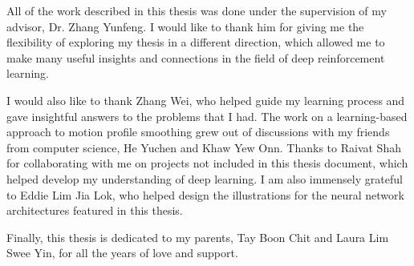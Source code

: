 \begin{acknowledgments}
All of the work described in this thesis was done under the supervision of my advisor, Dr. Zhang Yunfeng. I would like to thank him for giving me the flexibility of exploring my thesis in a different direction, which allowed me to make many useful insights and connections in the field of deep reinforcement learning.

I would also like to thank Zhang Wei, who helped guide my learning process and gave insightful answers to the problems that I had. The work on a learning-based approach to motion profile smoothing grew out of discussions with my friends from computer science, He Yuchen and Khaw Yew Onn. Thanks to Raivat Shah for collaborating with me on projects not included in this thesis document, which helped develop my understanding of deep learning. I am also immensely grateful to Eddie Lim Jia Lok, who helped design the illustrations for the neural network architectures featured in this thesis.

Finally, this thesis is dedicated to my parents, Tay Boon Chit and Laura Lim Swee Yin, for all the years of love and support.
\end{acknowledgments}

